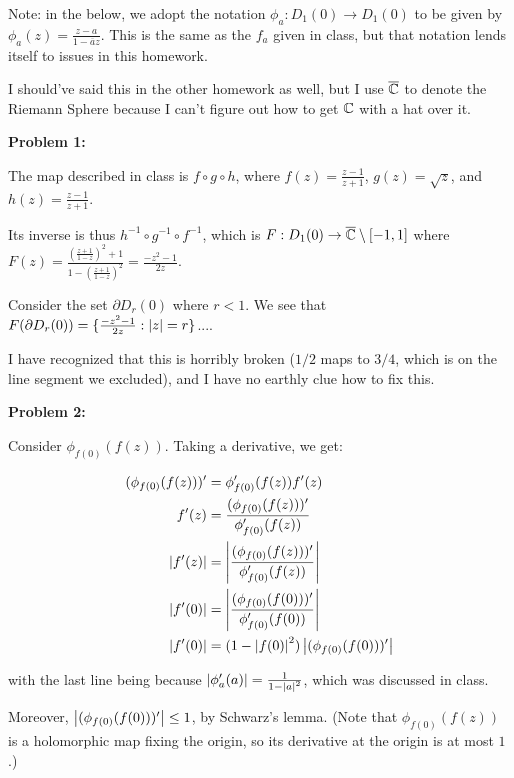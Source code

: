 \documentclass[a4paper,12pt]{article}
\begin{document}
Note: in the below, we adopt the notation $\phi_a: D_1(0) \to D_1(0)$ to be given by $\phi_a(z) = \frac{z-a}{1-\overline{a}z}$. This is the same as the $f_a$ given in class, but that notation lends itself to issues in this homework. 

I should've said this in the other homework as well, but I use $\overline{\mathbb{C}}$ to denote the Riemann Sphere because I can't figure out how to get $\mathbb{C}$ with a hat over it.

{\bf Problem 1:} %

The map described in class is $f\circ g \circ h$, where $f(z) = \frac{z-1}{z+1}$, $g(z) = \sqrt{z}$, and $h(z) = \frac{z-1}{z+1}$.

Its inverse is thus $h^{-1} \circ g^{-1} \circ f^{-1}$, which is $F: D_1(0) \to \overline{\mathbb{C}} \setminus [-1,1]$ where $F(z) = \frac{\left(\frac{z+1}{1-z}\right)^2 + 1}{1-\left(\frac{z+1}{1-z}\right)^2} = \frac{-z^2-1}{2z}$.

Consider the set $\partial D_r(0)$ where $r < 1$. We see that $F(\partial D_r(0)) = \{\frac{-z^2-1}{2z}: \left\lvert z \right\rvert = r\}$....

I have recognized that this is horribly broken ($1/2$ maps to $3/4$, which is on the line segment we excluded), and I have no earthly clue how to fix this.

\shunt

{\bf Problem 2:}

Consider $\phi_{f(0)}(f(z))$. Taking a derivative, we get:

\begin{align*}
(\phi_{f(0)}(f(z)))' &= \phi_{f(0)}'(f(z))f'(z)\\
f'(z) &= \frac{(\phi_{f(0)}(f(z)))'}{\phi_{f(0)}'(f(z))}\\
\left\lvert f'(z) \right\rvert &= \left\lvert \frac{(\phi_{f(0)}(f(z)))'}{\phi_{f(0)}'(f(z))} \right\rvert\\
\left\lvert f'(0) \right\rvert &= \left\lvert \frac{(\phi_{f(0)}(f(0)))'}{\phi_{f(0)}'(f(0))} \right\rvert\\
\left\lvert f'(0) \right\rvert &= (1-\left\lvert f(0) \right\rvert^2)\left\lvert (\phi_{f(0)}(f(0)))' \right\rvert\\
\end{align*}

with the last line being because $\left\lvert \phi_{a}'(a) \right\rvert = \frac{1}{1-\left\lvert a \right\rvert^2}$, which was discussed in class.

Moreover, $\left\lvert (\phi_{f(0)}(f(0)))' \right\rvert \leq 1$, by Schwarz's lemma. (Note that $\phi_{f(0)}(f(z))$ is a holomorphic map fixing the origin, so its derivative at the origin is at most $1$.)
\end{document}
